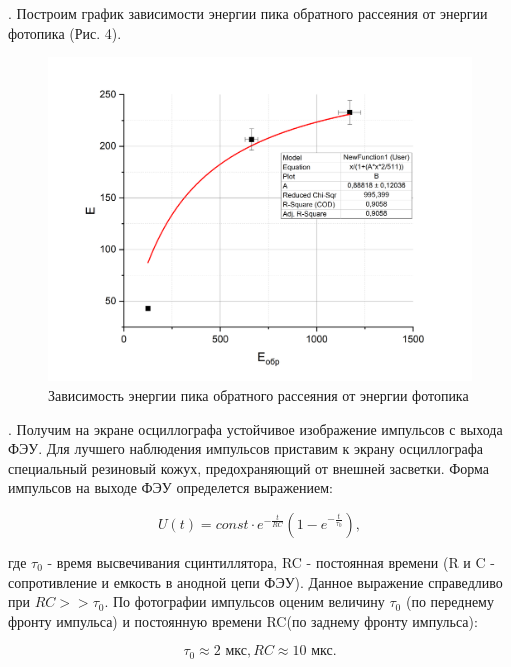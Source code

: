 \documentclass[a4paper,12pt]{article} %
\begin{document}
\medskip


. Построим график зависимости энергии пика обратного рассеяния от энергии фотопика (Рис. 4).

\begin{figure}[h!]
    \centering
    \includegraphics[scale=0.5]{Eobr.png}
    \caption{Зависимость энергии пика обратного рассеяния от энергии фотопика}
    
\end{figure}

\medskip

. Получим на экране осциллографа устойчивое изображение импульсов с выхода ФЭУ. Для лучшего наблюдения импульсов приставим к экрану осциллографа специальный резиновый кожух, предохраняющий от внешней засветки. Форма импульсов на выходе ФЭУ определется выражением:

$$ U(t) = const \cdot e^{-\frac{t}{RC}}(1-e^{-\frac{t}{\tau_0}}),$$

\noindent где $\tau_0$ - время высвечивания сцинтиллятора, RC - постоянная времени (R и C - сопротивление и емкость в анодной цепи ФЭУ). Данное выражение справедливо при $RC >> \tau_0$. По фотографии импульсов оценим величину $\tau_0$ (по переднему фронту импульса) и постоянную времени RC(по заднему фронту импульса):

$$ \tau_0 \approx 2 \text{ мкс}, RC \approx 10 \text{ мкс}.$$
\end{document}
